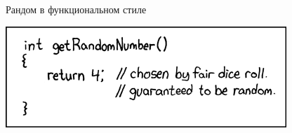 \begin{frame}{Рандом в функциональном стиле}
	\begin{center}
		\includegraphics[scale=0.3]{random_number.png}
	\end{center}
\end{frame}
